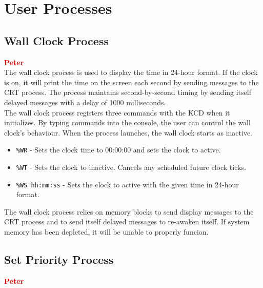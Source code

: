 \documentclass[12pt]{report}
\begin{document}
\section{User Processes}

\subsection{Wall Clock Process}

\textcolor{red}{\textbf{Peter}} \\

The wall clock process is used to display the time in 24-hour format. If the clock is on, it will print the time on the screen each second by sending messages to the CRT process. The process maintains second-by-second timing by sending itself delayed messages with a delay of 1000 milliseconds.\\

The wall clock process registers three commands with the KCD when it initializes. By typing commands into the console, the user can control the wall clock's behaviour. When the process launches, the wall clock starts as inactive.\\

\begin{itemize}

\item {\tt \%WR} - Sets the clock time to 00:00:00 and sets the clock to active.\\
\item {\tt \%WT} - Sets the clock to inactive. Cancels any scheduled future clock ticks.\\
\item {\tt \%WS hh:mm:ss} - Sets the clock to active with the given time in 24-hour format.\\

\end{itemize}

The wall clock process relies on memory blocks to send display messages to the CRT process and to send itself delayed messages to re-awaken itself. If system memory has been depleted, it will be unable to properly funcion.\\

\subsection{Set Priority Process}

\textcolor{red}{\textbf{Peter}} \\
\end{document}
